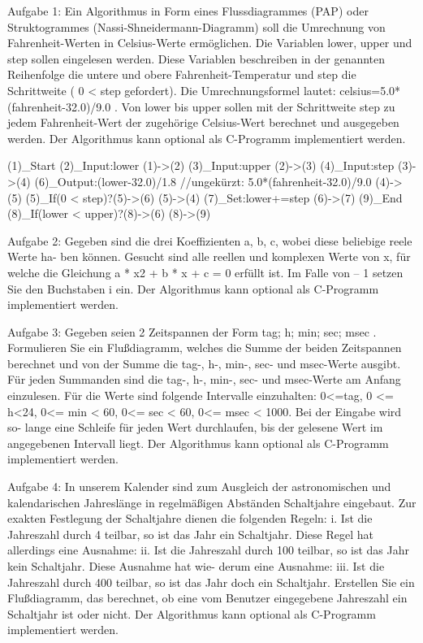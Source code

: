 Aufgabe 1: Ein Algorithmus in Form eines Flussdiagrammes (PAP) oder Struktogrammes (Nassi-Shneidermann-Diagramm) soll die Umrechnung von Fahrenheit-Werten in Celsius-Werte ermöglichen. Die Variablen lower, upper und step sollen eingelesen werden. Diese Variablen beschreiben in der genannten Reihenfolge die untere und obere Fahrenheit-Temperatur und step die Schrittweite ( 0 < step gefordert). Die Umrechnungsformel lautet: celsius=5.0*(fahrenheit-32.0)/9.0 .
Von lower bis upper sollen mit der Schrittweite step zu jedem Fahrenheit-Wert der zugehörige Celsius-Wert berechnet und ausgegeben werden. Der Algorithmus kann optional als C-Programm implementiert werden.

    (1)_Start
    (2)_Input:lower 
    (1)->(2)
    (3)_Input:upper
    (2)->(3)
    (4)_Input:step 
    (3)->(4)
    (6)_Output:(lower-32.0)/1.8  //ungekürzt: 5.0*(fahrenheit-32.0)/9.0
    (4)->(5)
    (5)_If(0 < step)?(5)->(6)
    (5)->(4)
    (7)_Set:lower+=step
    (6)->(7)
    (9)_End
    (8)_If(lower < upper)?(8)->(6)
    (8)->(9)

Aufgabe 2: Gegeben sind die drei Koeffizienten a, b, c, wobei diese beliebige reele Werte ha-
ben können. Gesucht sind alle reellen und komplexen Werte von x, für welche die Gleichung
a * x2 + b * x + c = 0 erfüllt ist. Im Falle von – 1 setzen Sie den Buchstaben i ein.
Der Algorithmus kann optional als C-Programm implementiert werden.

Aufgabe 3: Gegeben seien 2 Zeitspannen der Form tag; h; min; sec; msec . Formulieren Sie
ein Flußdiagramm, welches die Summe der beiden Zeitspannen berechnet und von der Summe
die tag-, h-, min-, sec- und msec-Werte ausgibt. Für jeden Summanden sind die tag-, h-, min-,
sec- und msec-Werte am Anfang einzulesen. Für die Werte sind folgende Intervalle einzuhalten:
0<=tag, 0 <= h<24, 0<= min < 60, 0<= sec < 60, 0<= msec < 1000. Bei der Eingabe wird so-
lange eine Schleife für jeden Wert durchlaufen, bis der gelesene Wert im angegebenen Intervall
liegt. Der Algorithmus kann optional als C-Programm implementiert werden.

Aufgabe 4: In unserem Kalender sind zum Ausgleich der astronomischen und kalendarischen
Jahreslänge in regelmäßigen Abständen Schaltjahre eingebaut. Zur exakten Festlegung der
Schaltjahre dienen die folgenden Regeln:
i. Ist die Jahreszahl durch 4 teilbar, so ist das Jahr ein Schaltjahr. Diese Regel hat allerdings eine
Ausnahme:
ii. Ist die Jahreszahl durch 100 teilbar, so ist das Jahr kein Schaltjahr. Diese Ausnahme hat wie-
derum eine Ausnahme:
iii. Ist die Jahreszahl durch 400 teilbar, so ist das Jahr doch ein Schaltjahr.
Erstellen Sie ein Flußdiagramm, das berechnet, ob eine vom Benutzer eingegebene Jahreszahl
ein Schaltjahr ist oder nicht. Der Algorithmus kann optional als C-Programm implementiert
werden.

